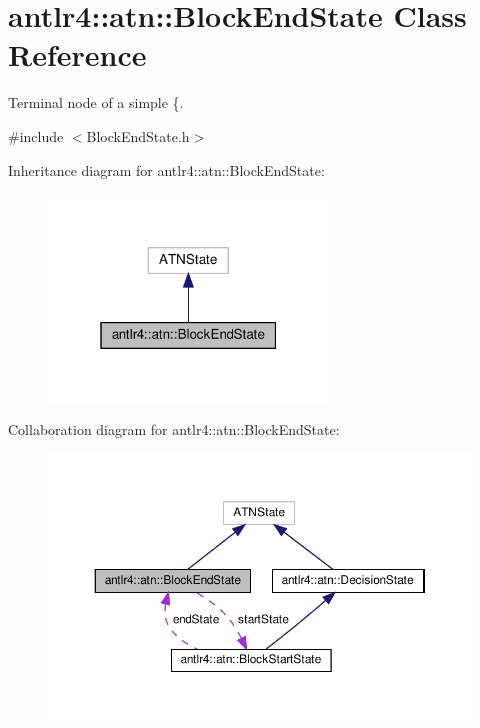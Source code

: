 \hypertarget{classantlr4_1_1atn_1_1BlockEndState}{}\section{antlr4\+:\+:atn\+:\+:Block\+End\+State Class Reference}
\label{classantlr4_1_1atn_1_1BlockEndState}


Terminal node of a simple \{.  




{\ttfamily \#include $<$Block\+End\+State.\+h$>$}



Inheritance diagram for antlr4\+:\+:atn\+:\+:Block\+End\+State\+:
\nopagebreak
\begin{figure}[H]
\begin{center}
\leavevmode
\includegraphics[width=211pt]{classantlr4_1_1atn_1_1BlockEndState__inherit__graph}
\end{center}
\end{figure}


Collaboration diagram for antlr4\+:\+:atn\+:\+:Block\+End\+State\+:
\nopagebreak
\begin{figure}[H]
\begin{center}
\leavevmode
\includegraphics[width=350pt]{classantlr4_1_1atn_1_1BlockEndState__coll__graph}
\end{center}
\end{figure}
